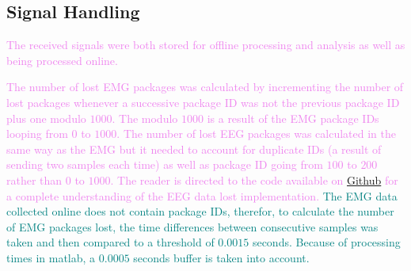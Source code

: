 
\subsection{Signal Handling}
\textcolor{violet}{The received signals were both stored for offline processing and analysis as well as being processed online.}

\textcolor{violet}{The number of lost EMG packages was calculated by incrementing the number of lost packages whenever a successive package ID was not the previous package ID plus one modulo $1000$. The modulo $1000$ is a result of the EMG package IDs looping from $0$ to $1000$.}
\textcolor{violet}{The number of lost EEG packages was calculated in the same way as the EMG but it needed to account for duplicate IDs (a result of sending two samples each time) as well as package ID going from $100$ to $200$ rather than $0$ to $1000$. The reader is directed to the code available on \href{https://github.com/ELA411}{Github} for a complete understanding of the EEG data lost implementation.}
\textcolor{teal}{The EMG data collected online does not contain package IDs, therefor, to calculate the number of EMG packages lost, the time differences between consecutive samples was taken and then compared to a threshold of $0.0015$ seconds. Because of processing times in matlab, a $0.0005$ seconds buffer is taken into account.}

